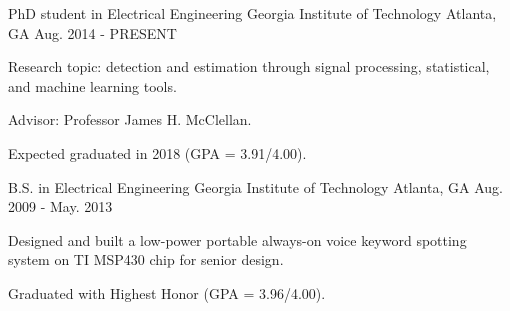 

\begin{cventries}

  \cventry
    {PhD student in Electrical Engineering} %
    {Georgia Institute of Technology} %
    {Atlanta, GA} %
    {Aug. 2014 - PRESENT} %
    {
      \begin{cvitems} %
        \item {Research topic: detection and estimation through signal processing, statistical, and machine learning tools.}
        \item {Advisor: Professor James H. McClellan.}
        \item {Expected graduated in 2018 (GPA = 3.91/4.00).}
      \end{cvitems}
    }
    
  \cventry
    {B.S. in Electrical Engineering} %
    {Georgia Institute of Technology} %
    {Atlanta, GA} %
    {Aug. 2009 - May. 2013} %
    {
      \begin{cvitems} %
        \item {Designed and built a low-power portable always-on voice keyword spotting system on TI MSP430 chip for senior design.}
        \item {Graduated with Highest Honor (GPA = 3.96/4.00).}
      \end{cvitems}
    }

\end{cventries}
